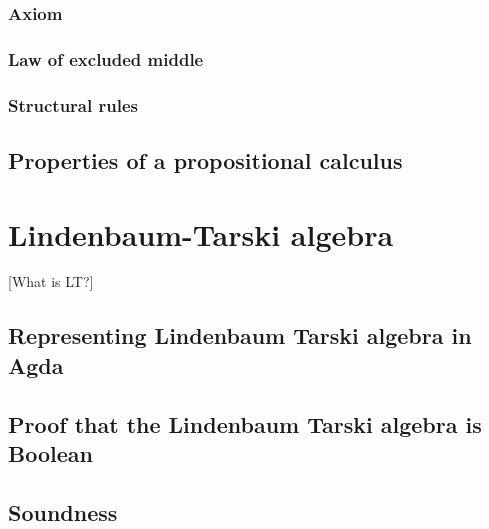 \documentclass[titlepage]{article}
\begin{document}
\subsubsection{Axiom}
\subsubsection{Law of excluded middle}
\subsubsection{Structural rules}




\subsection{Properties of a propositional calculus}






\section{Lindenbaum-Tarski algebra}
[What is LT?]

\subsection{Representing Lindenbaum Tarski algebra in Agda}
\subsection{Proof that the Lindenbaum Tarski algebra is Boolean}
\subsection{Soundness}



\end{document}
